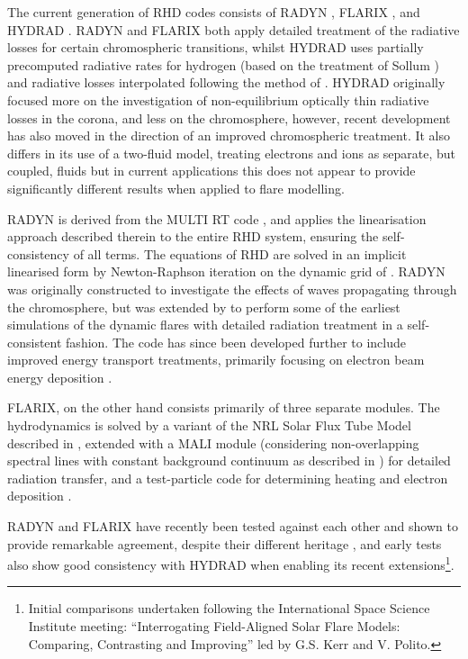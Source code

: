 The current generation of RHD codes consists of RADYN \citep{Carlsson1992a,Carlsson1995,Carlsson1999, Allred2015}, FLARIX \citep{Varady2010,Heinzel2015}, and HYDRAD \citep{Bradshaw2003, Bradshaw2013}. RADYN and FLARIX both apply detailed treatment of the radiative losses for certain chromospheric transitions, whilst HYDRAD uses partially precomputed radiative rates for hydrogen (based on the treatment of Sollum \NeedRef{}) and radiative losses interpolated following the method of \citet{Carlsson2012}.
HYDRAD originally focused more on the investigation of non-equilibrium optically thin radiative losses in the corona, and less on the chromosphere, however, recent development has also moved in the direction of an improved chromospheric treatment.
It also differs in its use of a two-fluid model, treating electrons and ions as separate, but coupled, fluids but in current applications this does not appear to provide significantly different results when applied to flare modelling.

RADYN is derived from the MULTI RT code \citep{Scharmer1985, Carlsson1986, Carlsson1992}, and applies the linearisation approach described therein to the entire RHD system, ensuring the self-consistency of all terms. The equations of RHD are solved in an implicit linearised form by Newton-Raphson iteration on the dynamic grid of \citet{Dorfi1987}.
RADYN was originally constructed to investigate the effects of waves propagating through the chromosphere, but was extended by \citet{Abbett1999} to perform some of the earliest simulations of the dynamic flares with detailed radiation treatment in a self-consistent fashion. The code has since been developed further to include improved energy transport treatments, primarily focusing on electron beam energy deposition \citep{Allred2005, Allred2015}.


FLARIX, on the other hand consists primarily of three separate modules. The hydrodynamics is solved by a variant of the NRL Solar Flux Tube Model described in \citet{Mariska1982,Mariska1989}, extended with a MALI module (considering non-overlapping spectral lines with constant background continuum as described in \citet{Rybicki1991}) for detailed radiation transfer, and a test-particle code for determining heating and electron deposition \citep{Varady2010, Heinzel2015}.

RADYN and FLARIX have recently been tested against each other and shown to provide remarkable agreement, despite their different heritage \citep{Kasparova2019}, and early tests also show good consistency with HYDRAD when enabling its recent extensions\footnote{Initial comparisons undertaken following the International Space Science Institute meeting: ``Interrogating Field-Aligned Solar Flare Models: Comparing, Contrasting and Improving'' led by G.S. Kerr and V. Polito.}.

